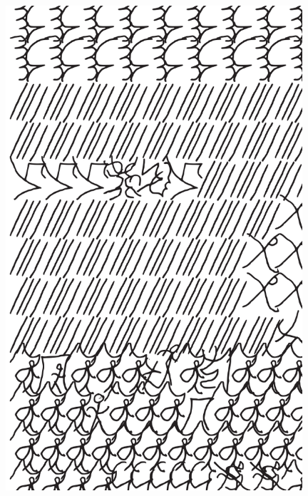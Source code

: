 \makeatletter\@openrightfalse
\movetooddpage
\begin{absolutelynopagebreak}
\begin{vplace}
\begin{figure}[H]
\begin{adjustwidth}{-0.99cm}{}
  \centering
  \vspace*{-1.77cm}
  \includegraphics[width=110mm]{./imgs/img8.pdf}  
  \hfill
\end{adjustwidth}

\thispagestyle{empty}

\end{figure}
\end{vplace}

\end{absolutelynopagebreak}

